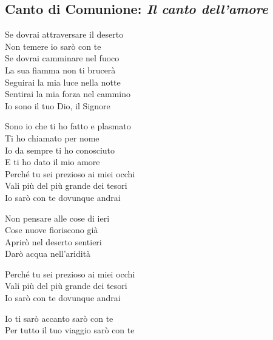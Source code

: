 \subsection*{Canto di Comunione: \textit{Il canto dell'amore}}

	\begin{mystrofe}
		Se dovrai attraversare il deserto \\
		Non temere io sarò con te \\
		Se dovrai camminare nel fuoco \\
		La sua fiamma non ti brucerà \\
		Seguirai la mia luce nella notte \\
		Sentirai la mia forza nel cammino \\
		Io sono il tuo Dio, il Signore \\
	\end{mystrofe}

	\hfill

	\begin{mystrofe}
		Sono io che ti ho fatto e plasmato \\
		Ti ho chiamato per nome \\
		Io da sempre ti ho conosciuto \\
		E ti ho dato il mio amore \\
		Perché tu sei prezioso ai miei occhi \\
		Vali più del più grande dei tesori \\
		Io sarò con te dovunque andrai
	\end{mystrofe}

	\hfill

	\begin{mystrofe}
		Non pensare alle cose di ieri \\
		Cose nuove fioriscono già \\
		Aprirò nel deserto sentieri \\
		Darò acqua nell'aridità \\
	\end{mystrofe}
		
	\begin{mystrofe}
		Perché tu sei prezioso ai miei occhi \\
		Vali più del più grande dei tesori \\
		Io sarò con te dovunque andrai
	\end{mystrofe}

	\hfill

	\begin{mystrofe}
		Io ti sarò accanto sarò con te \\
		Per tutto il tuo viaggio sarò con te
	\end{mystrofe}

